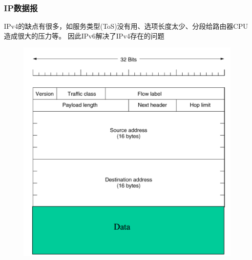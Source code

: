 \subsubsection{IP数据报}
IPv4的缺点有很多，如服务类型(ToS)没有用、选项长度太少、分段给路由器CPU造成很大的压力等。
因此IPv6解决了IPv4存在的问题
\begin{figure}[H]
	\centering
	\includegraphics[width=0.5\linewidth]{fig/ipv6-format.png}
\end{figure}
